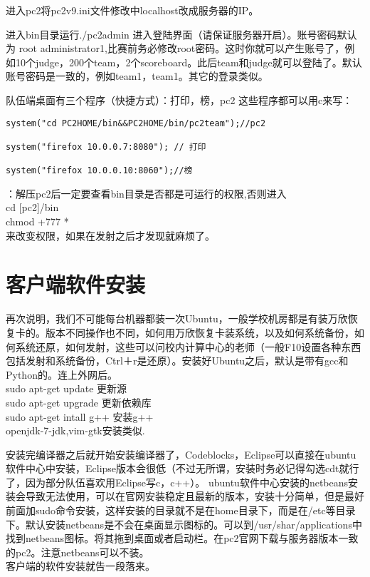 \documentclass[12pt]{article}
\begin{document}
进入pc2将pc2v9.ini文件修改中localhost改成服务器的IP。

进入bin目录运行./pc2admin 进入登陆界面（请保证服务器开启）。账号密码默认为 root administrator1,比赛前务必修改root密码。这时你就可以产生账号了，例如10个judge，200个team，2个scoreboard。此后team和judge就可以登陆了。默认账号密码是一致的，例如team1，team1。其它的登录类似。

队伍端桌面有三个程序（快捷方式）：打印，榜，pc2
这些程序都可以用c来写：
\begin{verbatim}
system("cd PC2HOME/bin&&PC2HOME/bin/pc2team");//pc2

system("firefox 10.0.0.7:8080"); // 打印

system("firefox 10.0.0.10:8060");//榜
\end{verbatim}
{\color{green}{特别:}}：解压pc2后一定要查看bin目录是否都是可运行的权限,否则进入 \\
cd [pc2]/bin  \\
chmod +777 * \\
来改变权限，如果在发射之后才发现就麻烦了。



\section{客户端软件安装}
再次说明，我们不可能每台机器都装一次Ubuntu，一般学校机房都是有装万欣恢复卡的。版本不同操作也不同，如何用万欣恢复卡装系统，以及如何系统备份，如何系统还原，如何发射，这些可以问校内计算中心的老师（一般F10设置各种东西包括发射和系统备份，Ctrl＋r是还原）。安装好Ubuntu之后，默认是带有gcc和Python的。连上外网后。\\
sudo apt-get update 更新源 \\
sudo apt-get upgrade 更新依赖库 \\
sudo apt-get intall g++ 安装g++ \\
openjdk-7-jdk,vim-gtk安装类似.

安装完编译器之后就开始安装编译器了，Codeblocks，Eclipse可以直接在ubuntu软件中心中安装，Eclipse版本会很低（不过无所谓，安装时务必记得勾选cdt就行了，因为部分队伍喜欢用Eclipse写c，c++）。
ubuntu软件中心安装的netbeans安装会导致无法使用，可以在官网安装稳定且最新的版本，安装十分简单，但是最好前面加sudo命令安装，这样安装的目录就不是在home目录下，而是在/etc等目录下。默认安装netbeans是不会在桌面显示图标的。可以到/usr/shar/applications中找到netbeans图标。将其拖到桌面或者启动栏。在pc2官网下载与服务器版本一致的pc2。注意netbeans可以不装。\\	
客户端的软件安装就告一段落来。
\end{document}
